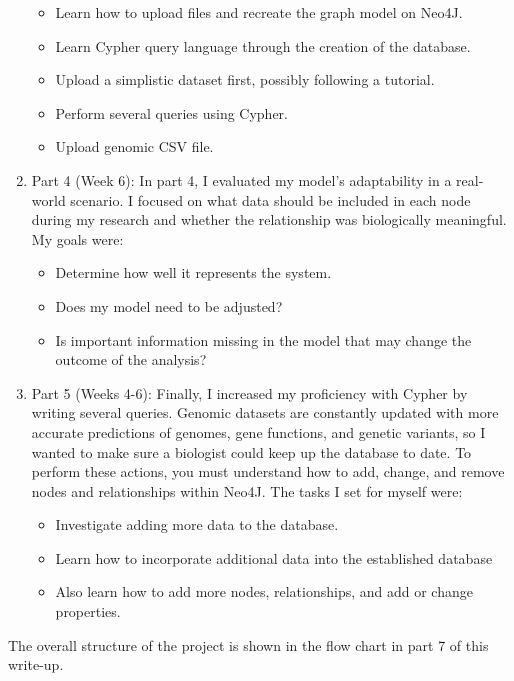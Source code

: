 \documentclass[]{article}
\begin{document}
\begin{enumerate}
\begin{itemize}
\item Learn how to upload files and recreate the graph model on Neo4J.
\item Learn Cypher query language through the creation of the database.
\item Upload a simplistic dataset first, possibly following a tutorial.
\item Perform several queries using Cypher.
\item Upload genomic CSV file.
\end{itemize}

\item Part 4 (Week 6):  In part 4, I evaluated my model's adaptability in a real-world scenario.  I focused on what data should be included in each node during my research and whether the relationship was biologically meaningful. My goals were:

\begin{itemize}

\item Determine how well it represents the system.
\item Does my model need to be adjusted?
\item Is important information missing in the model that may change the outcome of the analysis?
\end{itemize}

\item Part 5 (Weeks 4-6):  Finally, I increased my proficiency with Cypher by writing several queries.  Genomic datasets are constantly updated with more accurate predictions of genomes, gene functions, and genetic variants, so I wanted to make sure a biologist could keep up the database to date.  To perform these actions, you must understand how to add, change, and remove nodes and relationships within Neo4J.  The tasks I set for myself were:

\begin{itemize}
\item Investigate adding more data to the database.
\item Learn how to incorporate additional data into the established database
\item Also learn how to add more nodes, relationships, and add or change properties.
\end{itemize}
\end{enumerate}

The overall structure of the project is shown in the flow chart in part 7 of this write-up.
\end{document}
